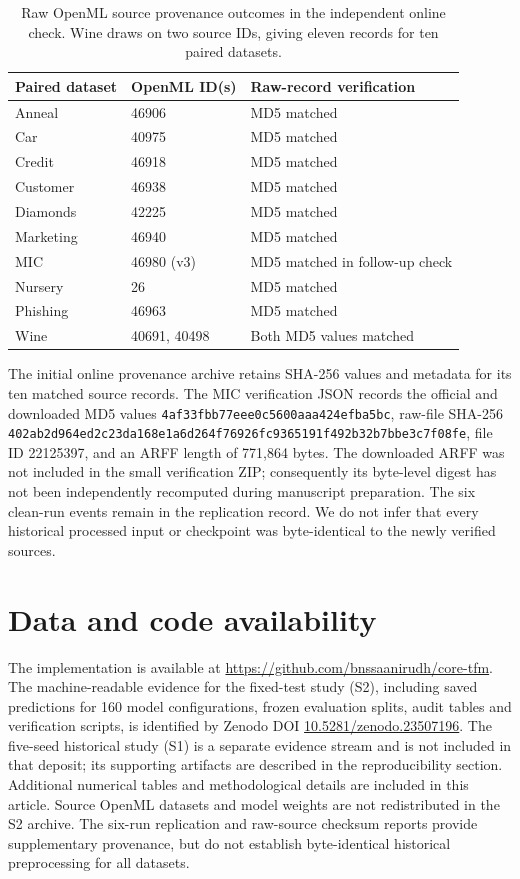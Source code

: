 \documentclass[a4paper,fleqn]{cas-sc}
\begin{document}
\begin{table}[htbp]
\centering
\caption{Raw OpenML source provenance outcomes in the independent online check. Wine draws on two source IDs, giving eleven records for ten paired datasets.}
\label{tab:openmlprovenance}
\begin{tabular}{lll}
\toprule
Paired dataset & OpenML ID(s) & Raw-record verification\\
\midrule
Anneal & 46906 & MD5 matched\\
Car & 40975 & MD5 matched\\
Credit & 46918 & MD5 matched\\
Customer & 46938 & MD5 matched\\
Diamonds & 42225 & MD5 matched\\
Marketing & 46940 & MD5 matched\\
MIC & 46980 (v3) & MD5 matched in follow-up check\\
Nursery & 26 & MD5 matched\\
Phishing & 46963 & MD5 matched\\
Wine & 40691, 40498 & Both MD5 values matched\\
\bottomrule
\end{tabular}
\end{table}
The initial online provenance archive retains SHA-256 values and metadata for its ten matched source records. The MIC verification JSON records the official and downloaded MD5 values \texttt{4af33fbb77eee0c5\allowbreak 600aaa424efba5bc}, raw-file SHA-256 \texttt{402ab2d964ed2c23\allowbreak da168e1a6d264f76\allowbreak 926fc9365191f492\allowbreak b32b7bbe3c7f08fe}, file ID 22125397, and an ARFF length of 771,864 bytes. The downloaded ARFF was not included in the small verification ZIP; consequently its byte-level digest has not been independently recomputed during manuscript preparation. The six clean-run events remain in the replication record. We do not infer that every historical processed input or checkpoint was byte-identical to the newly verified sources.

\FloatBarrier
\section*{Data and code availability}
The implementation is available at \url{https://github.com/bnssaanirudh/core-tfm}. The machine-readable evidence for the fixed-test study (S2), including saved predictions for 160 model configurations, frozen evaluation splits, audit tables and verification scripts, is identified by Zenodo DOI \href{https://doi.org/10.5281/zenodo.23507196}{10.5281/zenodo.23507196}. The five-seed historical study (S1) is a separate evidence stream and is not included in that deposit; its supporting artifacts are described in the reproducibility section. Additional numerical tables and methodological details are included in this article. Source OpenML datasets and model weights are not redistributed in the S2 archive. The six-run replication and raw-source checksum reports provide supplementary provenance, but do not establish byte-identical historical preprocessing for all datasets.
\end{document}
